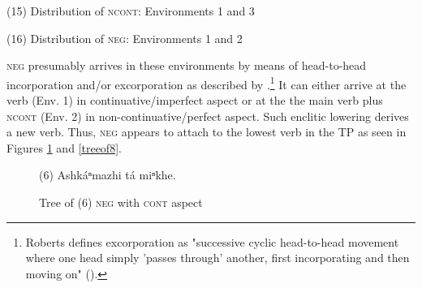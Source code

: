 \documentclass[output=paper]{LSP/langsci}
\begin{document}
\vspace{1em}
(15)	Distribution of \textsc{ncont}:	Environments 1 and 3

\vspace{1em}
(16)	Distribution of \textsc{neg}:	Environments 1 and 2

\vspace{1em}
\textsc{neg} presumably arrives in these environments by means of head-to-head incorporation and/or excorporation as described by \citet{Roberts1991}.\footnote{Roberts defines excorporation as "successive cyclic head-to-head movement where one head simply 'passes through' another, first incorporating and then moving on" (\citeyear[211]{1991}).} It can either arrive at the verb (Env. 1) in continuative/imperfect aspect or at the the main verb plus \textsc{ncont} (Env. 2) in non-continuative/perfect aspect. Such enclitic lowering derives a new verb. Thus, \textsc{neg} appears to attach to the lowest verb in the TP as seen in Figures \ref{treeof6} and \ref{treeof8}.

\begin{figure}
\caption{Tree of (6) \textsc{neg} with \textsc{cont} aspect} \label{treeof6}
\begin{center}
(6) Ashk\'aⁿmazhi t\'a miⁿkhe.

\end{center}
\end{figure}
\end{document}
